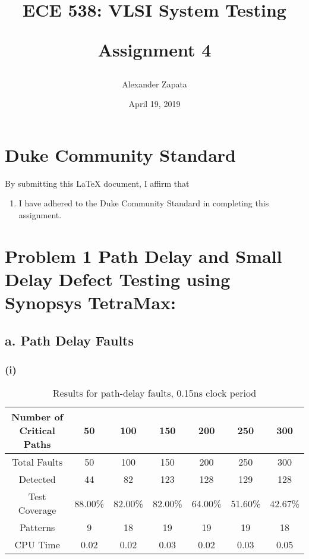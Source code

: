 \documentclass[letterpaper]{article} %
\begin{document}
\title{ECE 538: VLSI System Testing\\
\begin{large}{Assignment 4}\end{large}
\date{April 19, 2019}} %
\author{Alexander Zapata}
\maketitle


\vspace{12.0cm}
\section*{Duke Community Standard}

By submitting this \LaTeX{} document, I affirm that
\begin{enumerate}
    \item I have adhered to the Duke Community Standard in completing this assignment.
\end{enumerate}

\newpage 

\section*{Problem 1 {\small Path	Delay	and	Small	Delay	Defect	Testing	using	Synopsys	TetraMax:}}
\subsection*{a. Path Delay Faults}
\subsubsection*{(i)}

\begin{table}[ht]
\centering
\begin{tabular}{|c|c|c|c|c|c|c|}
\hline
Number of Critical Paths & 50      & 100     & 150     & 200     & 250     & 300     \\ \hline
Total Faults             & 50      & 100     & 150     & 200     & 250     & 300     \\ \hline
Detected                 & 44      & 82      & 123     & 128     & 129     & 128     \\ \hline
Test Coverage            & 88.00\% & 82.00\% & 82.00\% & 64.00\% & 51.60\% & 42.67\% \\ \hline
Patterns                 & 9       & 18      & 19      & 19      & 19      & 18      \\ \hline
CPU Time                 & 0.02    & 0.02    & 0.03    & 0.02    & 0.03    & 0.05    \\ \hline
\end{tabular}
\caption{Results for path-delay faults, 0.15ns clock period}
\end{table}
\end{document}
